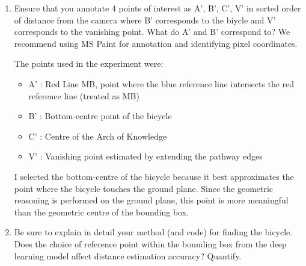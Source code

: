 \begin{enumerate}
\item Ensure that you annotate 4 points of interest as A', B', C', V'  in sorted order of distance from the camera where B' corresponds to the biycle and V' corresponds to the vanishing point.  What do A' and B' correspond to?
We recommend using MS Paint for annotation and identifying pixel coordinates.
\begin{studentSpace}
    \par The points used in the experiment were:
    \begin{itemize}
        \item A' : Red Line MB, point where the blue reference line intersects the red reference line (treated as MB)
        \item B' : Bottom-centre point of the bicycle
        \item C' : Centre of the Arch of Knowledge
        \item V' : Vanishing point estimated by extending the pathway edges
\end{itemize}
I selected the bottom-centre of the bicycle because it best approximates the point where the bicycle touches the ground plane. Since the geometric reasoning is performed on the ground plane, this point is more meaningful than the geometric centre of the bounding box.
\end{studentSpace}

\item Be sure to  explain in detail your method (and code) for finding the bicycle. Does the choice of reference point within the bounding box from the deep learning model affect distance estimation accuracy? Quantify.
\end{enumerate}
